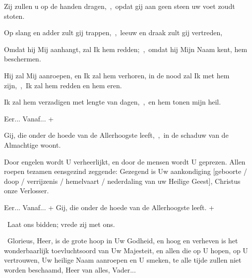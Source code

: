 \documentclass[12pt,twoside,a5paper]{article}
\begin{document}
\begin{halfparskip}
  Zij zullen u op de handen dragen,~\sep\ opdat gij aan geen steen uw voet zoudt stoten.

  Op slang en adder zult gij trappen,~\sep\ leeuw en draak zult gij vertreden,

  Omdat hij Mij aanhangt, zal Ik hem redden;~\sep\ omdat hij Mijn Naam kent, hem beschermen.

  Hij zal Mij aanroepen, en Ik zal hem verhoren, in de nood zal Ik met hem zijn,~\sep\ Ik zal hem redden en hem eren.

  Ik zal hem verzadigen met lengte van dagen,~\sep\ en hem tonen mijn heil.

  \fullline
    

  Eer... Vanaf... + 

   Gij, die onder de hoede van de Allerhoogste leeft,~\sep\ in de schaduw van de Almachtige woont.

   Door engelen wordt U verheerlijkt, en door de mensen wordt U geprezen. Allen roepen tezamen eensgezind zeggende: Gezegend is Uw aankondiging [geboorte / doop / verrijzenis / hemelvaart / nederdaling van uw Heilige Geest], Christus onze Verlosser.

  \fullline
   Eer... Vanaf... +  Gij, die onder de hoede van de Allerhoogste leeft. + 
\end{halfparskip}

\begin{halfparskip}
  \fullline
  \dd~Laat ons bidden; vrede zij met ons.

  \cc~Glorieus, Heer, is de grote hoop in Uw Godheid, en hoog en verheven is het wonderbaarlijk toevluchtsoord van Uw Majesteit, en allen die op U hopen, op U vertrouwen, Uw heilige Naam aanroepen en U smeken, te alle tijde zullen niet worden beschaamd, Heer van alles, Vader...
\end{halfparskip}
\end{document}
